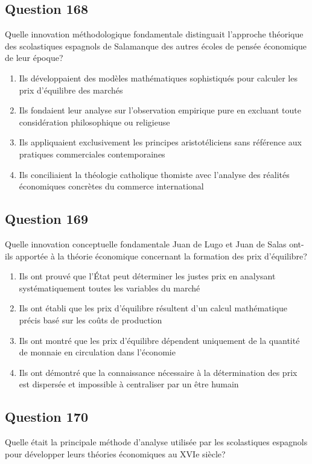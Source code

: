 \documentclass[12pt,a4paper]{article}
\begin{document}
\subsection*{Question 168}
Quelle innovation méthodologique fondamentale distinguait l'approche théorique des scolastiques espagnols de Salamanque des autres écoles de pensée économique de leur époque?

\begin{enumerate}[label=\Alph*., leftmargin=*]
\item Ils développaient des modèles mathématiques sophistiqués pour calculer les prix d'équilibre des marchés
\item Ils fondaient leur analyse sur l'observation empirique pure en excluant toute considération philosophique ou religieuse
\item Ils appliquaient exclusivement les principes aristotéliciens sans référence aux pratiques commerciales contemporaines
\item Ils conciliaient la théologie catholique thomiste avec l'analyse des réalités économiques concrètes du commerce international
\end{enumerate}

\bigskip


\subsection*{Question 169}
Quelle innovation conceptuelle fondamentale Juan de Lugo et Juan de Salas ont-ils apportée à la théorie économique concernant la formation des prix d'équilibre?

\begin{enumerate}[label=\Alph*., leftmargin=*]
\item Ils ont prouvé que l'État peut déterminer les justes prix en analysant systématiquement toutes les variables du marché
\item Ils ont établi que les prix d'équilibre résultent d'un calcul mathématique précis basé sur les coûts de production
\item Ils ont montré que les prix d'équilibre dépendent uniquement de la quantité de monnaie en circulation dans l'économie
\item Ils ont démontré que la connaissance nécessaire à la détermination des prix est dispersée et impossible à centraliser par un être humain
\end{enumerate}

\bigskip


\subsection*{Question 170}
Quelle était la principale méthode d'analyse utilisée par les scolastiques espagnols pour développer leurs théories économiques au XVIe siècle?
\end{document}
